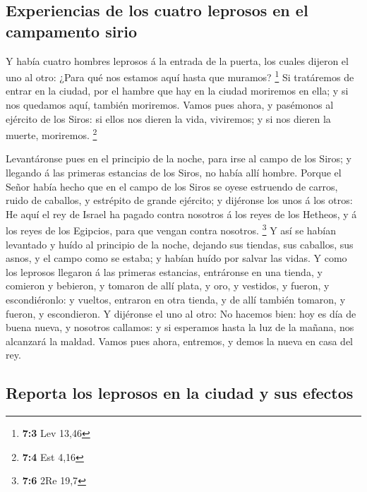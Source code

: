 \hypertarget{experiencias-de-los-cuatro-leprosos-en-el-campamento-sirio}{%
\subsection{Experiencias de los cuatro leprosos en el campamento
sirio}\label{experiencias-de-los-cuatro-leprosos-en-el-campamento-sirio}}

 Y había cuatro hombres leprosos á la entrada de la
puerta, los cuales dijeron el uno al otro: ¿Para qué nos estamos aquí
hasta que muramos? \footnote{\textbf{7:3} Lev 13,46}  Si
tratáremos de entrar en la ciudad, por el hambre que hay en la ciudad
moriremos en ella; y si nos quedamos aquí, también moriremos. Vamos pues
ahora, y pasémonos al ejército de los Siros: si ellos nos dieren la
vida, viviremos; y si nos dieren la muerte, moriremos. \footnote{\textbf{7:4}
  Est 4,16}

 Levantáronse pues en el principio de la noche, para irse
al campo de los Siros; y llegando á las primeras estancias de los Siros,
no había allí hombre.  Porque el Señor había hecho que en
el campo de los Siros se oyese estruendo de carros, ruido de caballos, y
estrépito de grande ejército; y dijéronse los unos á los otros: He aquí
el rey de Israel ha pagado contra nosotros á los reyes de los Hetheos, y
á los reyes de los Egipcios, para que vengan contra nosotros.
\footnote{\textbf{7:6} 2Re 19,7}  Y así se habían
levantado y huído al principio de la noche, dejando sus tiendas, sus
caballos, sus asnos, y el campo como se estaba; y habían huído por
salvar las vidas.  Y como los leprosos llegaron á las
primeras estancias, entráronse en una tienda, y comieron y bebieron, y
tomaron de allí plata, y oro, y vestidos, y fueron, y escondiéronlo: y
vueltos, entraron en otra tienda, y de allí también tomaron, y fueron, y
escondieron.  Y dijéronse el uno al otro: No hacemos bien:
hoy es día de buena nueva, y nosotros callamos: y si esperamos hasta la
luz de la mañana, nos alcanzará la maldad. Vamos pues ahora, entremos, y
demos la nueva en casa del rey.

\hypertarget{reporta-los-leprosos-en-la-ciudad-y-sus-efectos}{%
\subsection{Reporta los leprosos en la ciudad y sus
efectos}\label{reporta-los-leprosos-en-la-ciudad-y-sus-efectos}}

